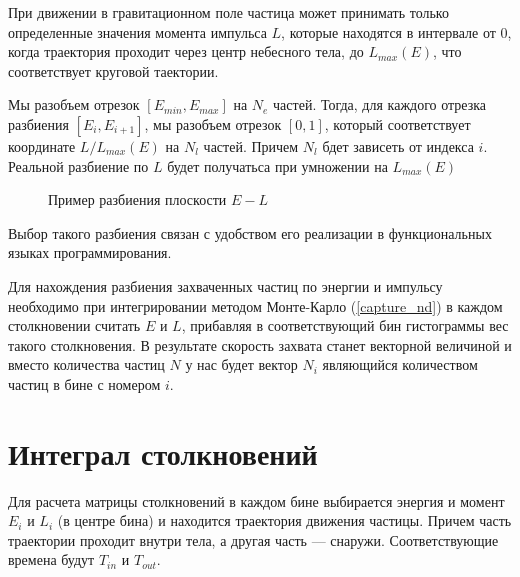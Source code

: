 При движении в гравитационном поле частица может принимать только определенные значения 
момента импульса $L$, которые находятся в интервале от $0$, когда траектория проходит через центр небесного тела, до $L_{max}(E)$, что соответствует круговой таектории.


Мы разобъем отрезок $[E_{min},E_{max}]$ на $N_e$ частей. Тогда, для каждого 
отрезка разбиения $[E_{i},E_{i+1}]$, мы разобъем отрезок $[0,1]$, который соответствует координате $L/L_{max}(E)$ на $N_l$ частей. Причем
$N_l$ бдет зависеть от индекса $i$. Реальной разбиение по $L$ будет получатьса при умножении на $L_{max}(E)$

\begin{figure}
\begin{center}
\label{plot:EL_grid}
\caption{Пример разбиения плоскости $E-L$}
\end{center}	
\end{figure}

Выбор такого разбиения связан с удобством его реализации в функциональных языках программирования.

Для нахождения разбиения захваченных частиц по энергии и импульсу необходимо при интегрировании методом Монте-Карло (\ref{capture_nd}) в каждом столкновении считать $E$ и $L$, прибавляя в соответствующий бин гистограммы вес такого столкновения. В результате
скорость захвата станет векторной величиной и вместо количества частиц $N$ у нас будет
вектор $N_i$ являющийся количеством частиц в бине с номером $i$.

\section{Интеграл столкновений}
Для расчета матрицы столкновений в каждом бине выбирается энергия и момент $E_i$ и $L_i$ (в центре бина) и находится траектория движения частицы. Причем часть траектории проходит внутри тела, а другая часть --- снаружи. Соответствующие времена  будут $T_{in}$ и $T_{out}$. 

